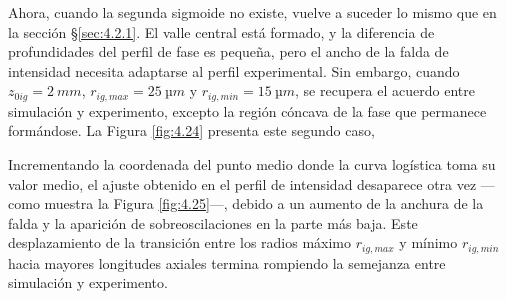 Ahora, cuando la segunda sigmoide no existe, vuelve a suceder lo mismo que en la sección \S\ref{sec:4.2.1}. El valle central está formado, y la diferencia de profundidades del perfil de fase es pequeña, pero el ancho de la falda de intensidad necesita adaptarse al perfil experimental. Sin embargo, cuando $z_{0ig}=\qty{2}{mm}$, $r_{ig,max}=\qty{25}{µm}$ y $r_{ig,min}=\qty{15}{µm}$, se recupera el acuerdo entre simulación y experimento, excepto la región cóncava de la fase que permanece formándose. La Figura \ref{fig:4.24} presenta este segundo caso, 

Incrementando la coordenada del punto medio donde la curva logística toma su valor medio, el ajuste obtenido en el perfil de intensidad desaparece otra vez ---como muestra la Figura \ref{fig:4.25}---, debido a un aumento de la anchura de la falda y la aparición de sobreoscilaciones en la parte más baja. Este desplazamiento de la transición entre los radios máximo $r_{ig,max}$ y mínimo $r_{ig,min}$ hacia mayores longitudes axiales termina rompiendo la semejanza entre simulación y experimento. 

